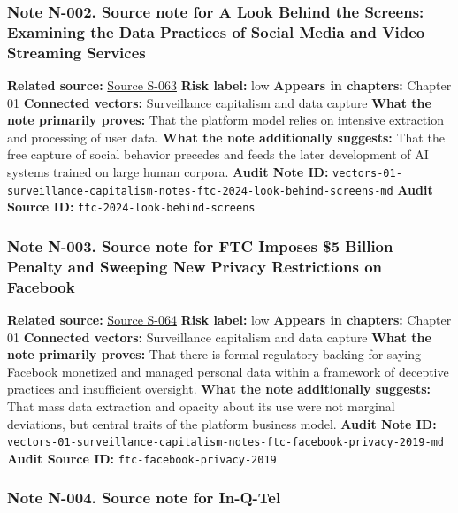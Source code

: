 \documentclass[
  american,
  11pt,
  letterpaper,
]{article}
\begin{document}
\subsubsection{Note N-002. Source note for A Look Behind the Screens:
Examining the Data Practices of Social Media and Video Streaming
Services}\label{note-n-002-vectors-01-surveillance-capitalism-notes-ftc-2024-look-behind-screens-md}

\textbf{Related source:}
\hyperref[source-s-063-a-look-behind-the-screens-examining-the-data-practices-of-social-media-and-video-streaming-services]{Source
S-063} \textbf{Risk label:} low \textbf{Appears in chapters:} Chapter 01
\textbf{Connected vectors:} Surveillance capitalism and data capture
\textbf{What the note primarily proves:} That the platform model relies
on intensive extraction and processing of user data. \textbf{What the
note additionally suggests:} That the free capture of social behavior
precedes and feeds the later development of AI systems trained on large
human corpora. \textbf{Audit Note ID:}
\texttt{vectors-01-surveillance-capitalism-notes-ftc-2024-look-behind-screens-md}
\textbf{Audit Source ID:} \texttt{ftc-2024-look-behind-screens}

\subsubsection{Note N-003. Source note for FTC Imposes \$5 Billion
Penalty and Sweeping New Privacy Restrictions on
Facebook}\label{note-n-003-vectors-01-surveillance-capitalism-notes-ftc-facebook-privacy-2019-md}

\textbf{Related source:}
\hyperref[source-s-064-ftc-imposes-5-billion-penalty-and-sweeping-new-privacy-restrictions-on-facebook]{Source
S-064} \textbf{Risk label:} low \textbf{Appears in chapters:} Chapter 01
\textbf{Connected vectors:} Surveillance capitalism and data capture
\textbf{What the note primarily proves:} That there is formal regulatory
backing for saying Facebook monetized and managed personal data within a
framework of deceptive practices and insufficient oversight.
\textbf{What the note additionally suggests:} That mass data extraction
and opacity about its use were not marginal deviations, but central
traits of the platform business model. \textbf{Audit Note ID:}
\texttt{vectors-01-surveillance-capitalism-notes-ftc-facebook-privacy-2019-md}
\textbf{Audit Source ID:} \texttt{ftc-facebook-privacy-2019}

\subsubsection{Note N-004. Source note for
In-Q-Tel}\label{note-n-004-vectors-01-surveillance-capitalism-notes-iqt-homepage-2026-md}
\end{document}
